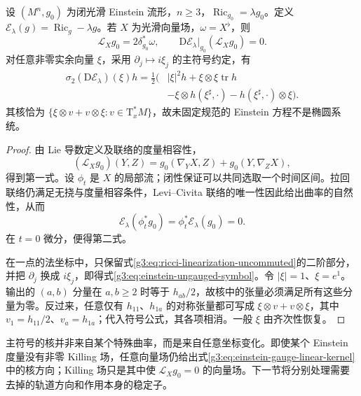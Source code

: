 \begin{proposition}\label{g3:prop:einstein-diffeomorphism-degeneracy}
	设 \((M^n,g_0)\) 为闭光滑 Einstein 流形，\(n\ge3\)，\(\operatorname{Ric}_{g_0}=\lambda g_0\)。定义
	\(\mathcal E_\lambda(g)=\operatorname{Ric}_g-\lambda g\)。若 \(X\) 为光滑向量场，\(\omega=X^\flat\)，则
	\begin{equation}\label{g3:eq:einstein-gauge-linear-kernel}
		\mathcal L_Xg_0=2\delta_{g_0}^*\omega,\qquad
		\mathrm D\mathcal E_\lambda|_{g_0}(\mathcal L_Xg_0)=0.
	\end{equation}
	对任意非零实余向量 \(\xi\)，采用 \(\partial_j\mapsto i\xi_j\) 的主符号约定，有
	\begin{equation}\label{g3:eq:einstein-ungauged-symbol}
		\begin{aligned}
			\sigma_2(\mathrm D\mathcal E_\lambda)(\xi)h
			=\frac12\bigl(&|\xi|^2h+\xi\otimes\xi\operatorname{tr}h\\
			&-\xi\otimes h(\xi^\sharp,\cdot)-h(\xi^\sharp,\cdot)\otimes\xi\bigr).
		\end{aligned}
	\end{equation}
	其核恰为 \(\{\xi\otimes v+v\otimes\xi:v\in\mathrm T^*_xM\}\)，故未固定规范的 Einstein 方程不是椭圆系统。
\end{proposition}
\begin{proof}
	由 Lie 导数定义及联络的度量相容性，
	\[
		(\mathcal L_Xg_0)(Y,Z)=g_0(\nabla_YX,Z)+g_0(Y,\nabla_ZX),
	\]
	得到第一式。设 \(\phi_t\) 是 \(X\) 的局部流；闭性保证可以共同选取一个时间区间。拉回联络仍满足无挠与度量相容条件，Levi--Civita 联络的唯一性因此给出曲率的自然性，从而
	\[
		\mathcal E_\lambda(\phi_t^*g_0)=\phi_t^*\mathcal E_\lambda(g_0)=0.
	\]
	在 \(t=0\) 微分，便得第二式。

	在一点的法坐标中，只保留式\eqref{g3:eq:ricci-linearization-uncommuted}的二阶部分，并把 \(\partial_j\) 换成 \(i\xi_j\)，即得式\eqref{g3:eq:einstein-ungauged-symbol}。令 \(|\xi|=1\)、\(\xi=e^1\)。输出的 \((a,b)\) 分量在 \(a,b\ge2\) 时等于 \(h_{ab}/2\)，故核中的张量必须满足所有这些分量为零。反过来，任意仅有 \(h_{11}\)、\(h_{1a}\) 的对称张量都可写成 \(\xi\otimes v+v\otimes\xi\)，其中 \(v_1=h_{11}/2\)、\(v_a=h_{1a}\)；代入符号公式，其各项相消。一般 \(\xi\) 由齐次性恢复。
\end{proof}

主符号的核并非来自某个特殊曲率，而是来自任意坐标变化。即使某个 Einstein 度量没有非零 Killing 场，任意向量场仍给出式\eqref{g3:eq:einstein-gauge-linear-kernel}中的核方向；Killing 场只是其中使 \(\mathcal L_Xg_0=0\) 的向量场。下一节将分别处理需要去掉的轨道方向和作用本身的稳定子。

